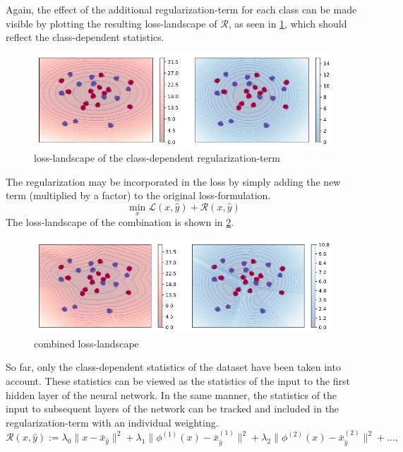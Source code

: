 Again, the effect of the additional regularization-term for each class can be made visible by plotting the resulting loss-landscape of $\mathcal R$, as seen in \ref{fig:toy_dataset_loss_stats}, which should reflect the class-dependent statistics.

\begin{figure}
\centering
\includegraphics[width=\textwidth]{Figures/toy_dataset_loss_stats.png}
\decoRule
\caption{loss-landscape of the class-dependent regularization-term}
\label{fig:toy_dataset_loss_stats}
\end{figure}

The regularization may be incorporated in the loss by simply adding the new term (multiplied by a factor) to the original loss-formulation.
$$\min_x \mathcal L (x,\hat y) + \mathcal R(x,\hat y)
$$
The loss-landscape of the combination is shown in \ref{fig:toy_dataset_loss_combined}.

\begin{figure}
\centering
\includegraphics[width=\textwidth]{Figures/toy_dataset_loss_combined.png}
\decoRule
\caption{combined loss-landscape}
\label{fig:toy_dataset_loss_combined}
\end{figure}

So far, only the class-dependent statistics of the dataset have been taken into account. These statistics can be viewed as the statistics of the input to the first hidden layer of the neural network. In the same manner, the statistics of the input to subsequent layers of the network can be tracked and included in the regularization-term with an individual weighting.
$$\mathcal R(x,\hat y) := 
\lambda_0 \|x-\bar x_{\hat y}\|^2 
+ \lambda_1 \|\phi^{(1)} (x)-\bar x_{\hat y}^{(1)}\|^2
+ \lambda_2 \|\phi^{(2)} (x)-\bar x_{\hat y}^{(2)}\|^2
+ \ldots
\comma$$

